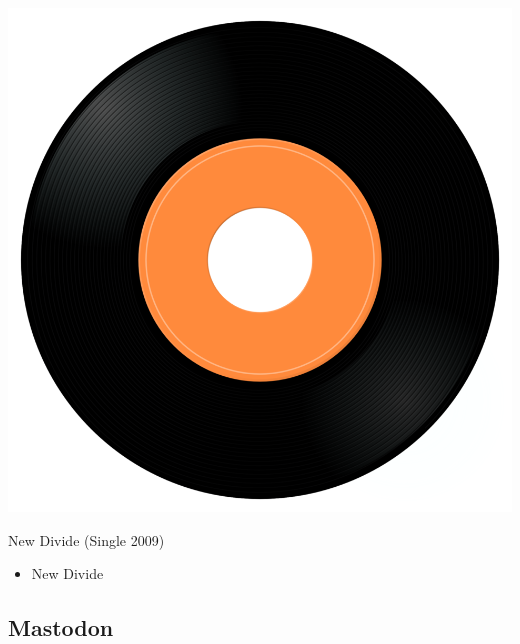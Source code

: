 \begin{minipage}[t]{0.25\textwidth}
\captionsetup{type=figure}
\includegraphics[width=\textwidth]{Images/cover.png}
\caption*{New Divide (Single 2009)}
\end{minipage}
\begin{minipage}[t]{0.25\textwidth}\vspace{0pt}
\begin{itemize}[nosep,leftmargin=1em,labelwidth=*,align=left]
	\setlength{\itemsep}{0pt}
	\item New Divide
\end{itemize}
\end{minipage}

\subsection{Mastodon}

